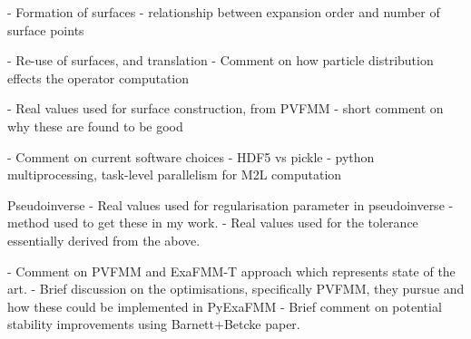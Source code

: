- Formation of surfaces
    - relationship between expansion order and number of surface points

- Re-use of surfaces, and translation
    - Comment on how particle distribution effects the operator computation

- Real values used for surface construction, from PVFMM
    - short comment on why these are found to be good

- Comment on current software choices
    - HDF5 vs pickle
    - python multiprocessing, task-level parallelism for M2L computation

Pseudoinverse
- Real values used for regularisation parameter in pseudoinverse
    - method used to get these in my work.
    - Real values used for the tolerance essentially derived from the above.

- Comment on PVFMM and ExaFMM-T approach which represents state of the art.
    - Brief discussion on the optimisations, specifically PVFMM,
    they pursue and how these could be implemented in PyExaFMM
    - Brief comment on potential stability improvements using Barnett+Betcke
    paper.
